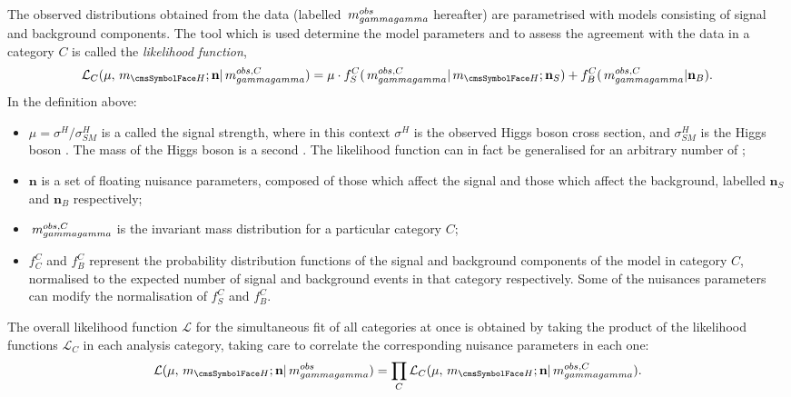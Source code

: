 The observed \mgg distributions obtained from the data (labelled $ \,m_{gammagamma}^{obs}$ hereafter) are parametrised with models consisting of signal and background components. The tool which is used determine the model parameters and to assess the agreement with the data in a category $C$ is called the \emph{likelihood function},
\begin{equation}
\label{eq:statandresults:likelihood_function}
\mathcal{L}_C(\mu, \mH; \mathbf{n} | \mgg^{obs,C} ) = \mu \cdot f^C_S(\mgg^{obs,C} |\mH ; \mathbf{n}_S) + f^C_B(\mgg^{obs,C} | \mathbf{n}_B ). 
\end{equation}
In the definition above:
\begin{itemize}
\item $\mu = \sigma^{H} / \sigma^{H}_{SM}$ is a \POI called the signal strength, where in this context $\sigma^H$ is the observed Higgs boson cross section, and $\sigma^H_{SM}$ is the \SM Higgs boson \crosssection. The mass of the Higgs boson \mH is a second \POI. The likelihood function can in fact be generalised for an arbitrary number of \POI\s; 
\item $\mathbf{n}$ is a set of floating nuisance parameters, composed of those which affect the signal and those which affect the background, labelled $\mathbf{n}_S$ and $\mathbf{n}_B$ respectively;
\item  $\,m_{gammagamma}^{obs,C}$ is the invariant mass distribution for a particular category $C$;
\item $f^C_C$ and $f^C_B$ represent the probability distribution functions of the signal and background components of the model in category $C$, normalised to the expected number of signal and background events in that category respectively. Some of the nuisances parameters can modify the normalisation of $f^C_S$ and $f^C_B$. 
\end{itemize}
The overall likelihood function $\mathcal{L}$ for the simultaneous fit of all categories at once is obtained by taking the product of the likelihood functions $\mathcal{L}_C$ in each analysis category, taking care to correlate the corresponding nuisance parameters in each one:
\begin{equation}
\label{eq:statandresults:likelihood_function_product}
\mathcal{L}(\mu, \mH; \mathbf{n} | \mgg^{obs} ) = \prod_{C} \mathcal{L}_C(\mu, \mH; \mathbf{n} | \mgg^{obs,C} ).
\end{equation}

